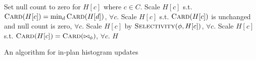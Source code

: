 \newcommand{\InlineIte}[3]{#2\ \textbf{if}\ #1\ \textbf{else}\ #3}
\renewcommand{\algorithmicindent}{1em}

\begin{algorithmic}
  
  \State Set null count to zero for $H[c]$ where $c \in C$.
  \State Scale $H[c]$ s.t. $\Call{Card}{H[c]} = \min_d \Call{Card}{H[d]}$, $\forall c$.
  \State Scale $H[c]$ s.t. $\Call{Card}{H[c]}$ is unchanged and null
  \State count is zero, $\forall c$.
  \State Scale $H[c]$ by $\Call{Selectivity}{\phi, H[c]}$, $\forall c$.
  \State Scale $H[c]$ s.t. $\Call{Card}{H[c]} = \Call{Card}{\bowtie_\phi}$, $\forall c$.
  \EndIf
  \State \Return $H$
  \EndFunction
\end{algorithmic}
\caption{An algorithm for in-plan histogram updates}
\label{algo:histogram-transformation}
  
